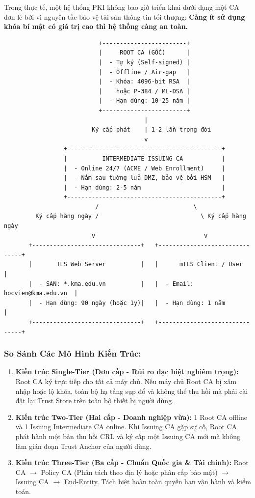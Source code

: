 \documentclass[
]{article}
\providecommand{\tightlist}{%
  \setlength{\itemsep}{0pt}\setlength{\parskip}{0pt}}
\begin{document}
Trong thực tế, một hệ thống PKI không bao giờ triển khai dưới dạng một
CA đơn lẻ bởi vì nguyên tắc bảo vệ tài sản thông tin tối thượng:
\textbf{Càng ít sử dụng khóa bí mật có giá trị cao thì hệ thống càng an
toàn.}

\begin{verbatim}
                           +------------------------+
                           |     ROOT CA (GỐC)      |
                           |  - Tự ký (Self-signed) |
                           |  - Offline / Air-gap   |
                           |  - Khóa: 4096-bit RSA  |
                           |    hoặc P-384 / ML-DSA |
                           |  - Hạn dùng: 10-25 năm |
                           +------------------------+
                                        |
                         Ký cấp phát    | 1-2 lần trong đời
                                        v
                 +--------------------------------------------+
                 |          INTERMEDIATE ISSUING CA           |
                 |  - Online 24/7 (ACME / Web Enrollment)     |
                 |  - Nằm sau tường lửa DMZ, bảo vệ bởi HSM   |
                 |  - Hạn dùng: 2-5 năm                       |
                 +--------------------------------------------+
                          /                           \
         Ký cấp hàng ngày /                             \ Ký cấp hàng ngày
                         v                               v
       +-------------------------------+   +-------------------------------+
       |       TLS Web Server          |   |      mTLS Client / User       |
       |  - SAN: *.kma.edu.vn          |   |  - Email: hocvien@kma.edu.vn  |
       |  - Hạn dùng: 90 ngày (hoặc 1y)|   |  - Hạn dùng: 1 năm            |
       +-------------------------------+   +-------------------------------+
\end{verbatim}

\subsubsection{So Sánh Các Mô Hình Kiến
Trúc:}\label{so-suxe1nh-cuxe1c-muxf4-huxecnh-kiux1ebfn-truxfac}

\begin{enumerate}
\def\labelenumi{\arabic{enumi}.}
\tightlist
\item
  \textbf{Kiến trúc Single-Tier (Đơn cấp - Rủi ro đặc biệt nghiêm
  trọng):} Root CA ký trực tiếp cho tất cả máy chủ. Nếu máy chủ Root CA
  bị xâm nhập hoặc lộ khóa, toàn bộ hạ tầng sụp đổ và không thể thu hồi
  mà phải cài đặt lại Trust Store trên toàn bộ thiết bị người dùng.
\item
  \textbf{Kiến trúc Two-Tier (Hai cấp - Doanh nghiệp vừa):} 1 Root CA
  offline và 1 Issuing Intermediate CA online. Khi Issuing CA gặp sự cố,
  Root CA phát hành một bản thu hồi CRL và ký cấp một Issuing CA mới mà
  không làm gián đoạn Trust Anchor của người dùng.
\item
  \textbf{Kiến trúc Three-Tier (Ba cấp - Chuẩn Quốc gia \& Tài chính):}
  Root CA \(\to\) Policy CA (Phân tách theo địa lý hoặc phân cấp bảo
  mật) \(\to\) Issuing CA \(\to\) End-Entity. Tách biệt hoàn toàn quyền
  hạn vận hành và kiểm toán.
\end{enumerate}
\end{document}

